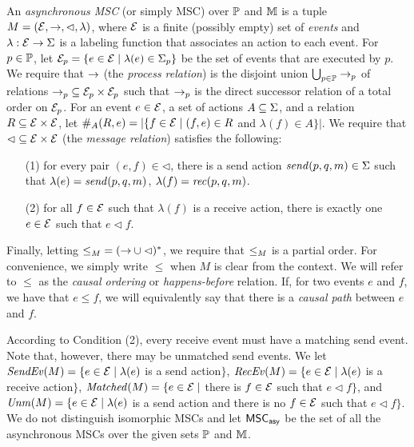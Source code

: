 \documentclass{article}
\begin{document}
\begin{definition}
An \emph{asynchronous MSC} (or simply MSC) over $\Procs$ and $\Msg$ is a tuple $\msc = (\Events,\procrel,\lhd,\lambda)$, where $\Events$ is a finite (possibly empty) set of \emph{events} and $\lambda: \Events \to \Act$ is a labeling function that associates an action to each event. For $p \in \Procs$, let $\Events_p = \{e \in \Events \mid \lambda(e) \in \pAct{p}\}$ be the set of events that are executed by $p$. We require that $\procrel$ (the \emph{process relation}) is the disjoint union $\bigcup_{p \in \Procs} \procrel_p$ of relations ${\procrel_p} \subseteq \Events_p \times \Events_p$ such that $\procrel_p$ is the direct successor relation of a total order on $\Events_p$. For an event $e \in \Events$, a set of actions $A \subseteq \Act$, and a relation $\rel \subseteq \Events \times \Events$,
let $\sametype{e}{A}{\rel} = |\{f \in \Events \mid (f,e) \in \rel$ and $\lambda(f) \in A\}|$. We require that ${\lhd} \subseteq \Events \times \Events$ (the \emph{message relation}) satisfies the following:
\begin{itemize}\itemsep=0.5ex
\item[(1)] for every pair $(e,f) \in {\lhd}$, there is a send action $\sact{p}{q}{\msg} \in \Act$ such that $\lambda(e) = \sact{p}{q}{\msg}$, $\lambda(f) = \ract{p}{q}{\msg}$.
\item[(2)] for all $f \in \Events$ such that $\lambda(f)$ is a receive action, there is exactly one $e \in \Events$ such that $e \lhd f$.
\end{itemize}
Finally, letting ${\le}_\msc = ({\procrel} \cup {\lhd})^\ast$,
we require that $\le_\msc$ is a partial order. For convenience, we simply write $\le$ when $M$ is clear from the context. We will refer to $\le$ as the \emph{causal ordering} or \emph{happens-before} relation. If, for two events $e$ and $f$, we have that $e \le f$, we will equivalently say that there is a \emph{causal path} between $e$ and $f$.
\end{definition}

According to Condition (2), every receive event must have a matching send event. Note that, however, there may be unmatched send events.
We let
$\SendEv{\msc} = \{e \in \Events \mid \lambda(e)$ is a send
action$\}$,
$\RecEv{\msc} = \{e \in \Events \mid \lambda(e)$ is a receive
action$\}$,
$\Matched{\msc} = \{e \in \Events \mid$ there is $f \in \Events$
such that $e \lhd f\}$, and
$\Unm{\msc} = \{e \in \Events \mid \lambda(e)$ is a send
action and there is no $f \in \Events$ such that $e \lhd f\}$.
%
We do not distinguish isomorphic MSCs and
let $\asMSCs$ be the set of all the asynchronous MSCs over the given sets $\Procs$ and $\Msg$.
\end{document}
